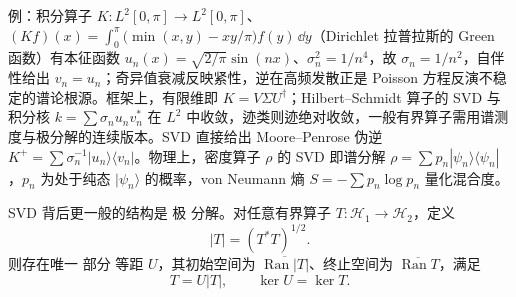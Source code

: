 例：积分算子 $K:L^2[0,\pi]\to L^2[0,\pi]$、$(Kf)(x)=\int_0^\pi\bigl(\min(x,y)-xy/\pi\bigr)f(y)\,\dd y$（Dirichlet 拉普拉斯的 Green 函数）有本征函数 $u_n(x)=\sqrt{2/\pi}\sin(nx)$、$\sigma_n^2=1/n^4$，故 $\sigma_n=1/n^2$，自伴性给出 $v_n=u_n$；奇异值衰减反映紧性，逆在高频发散正是 Poisson 方程反演不稳定的谱论根源。框架上，有限维即 $K=V\Sigma U^\dagger$；Hilbert--Schmidt 算子的 SVD 与积分核 $k=\sum\sigma_nu_nv_n^*$ 在 $L^2$ 中收敛，迹类则迹绝对收敛，一般有界算子需用谱测度与极分解的连续版本。SVD 直接给出 Moore--Penrose 伪逆 $K^+=\sum\sigma_n^{-1}|u_n\rangle\langle v_n|$。物理上，密度算子 $\rho$ 的 SVD 即谱分解 $\rho=\sum p_n|\psi_n\rangle\langle\psi_n|$，$p_n$ 为处于纯态 $|\psi_n\rangle$ 的概率，von Neumann 熵 $S=-\sum p_n\log p_n$ 量化混合度。

SVD 背后更一般的结构是 极 分解。对任意有界算子 $T:\mathcal H_1\to\mathcal H_2$，定义
\[
|T|=(T^*T)^{1/2}.
\]
则存在唯一 部分 等距 $U$，其初始空间为 $\overline{\operatorname{Ran}|T|}$、终止空间为 $\overline{\operatorname{Ran}T}$，满足
\begin{equation}
T=U|T|,
\qquad
\ker U=\ker T.
\label{eq:operator-polar-decomposition}
\end{equation}

